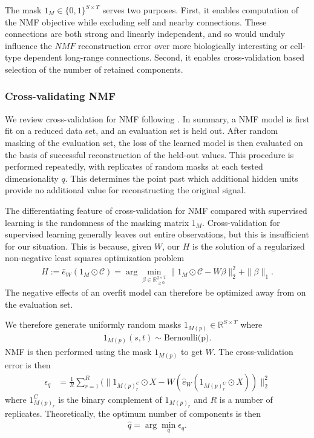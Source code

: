 The mask $1_M \in \{0,1\}^{S \times T}$ serves two purposes.
First, it enables computation of the NMF objective while excluding self and nearby connections.
These connections are both strong and linearly independent, and so would unduly influence the $NMF$ reconstruction error over more biologically interesting or cell-type dependent long-range connections.
Second, it enables cross-validation based selection of the number of retained components.

\subsubsection{Cross-validating NMF}

We review cross-validation for NMF following \citep{Perry2009-ia}.
In summary, a NMF model is first fit on a reduced data set, and an evaluation set is held out.
After random masking of the evaluation set, the loss of the learned model is then evaluated on the basis of successful reconstruction of the held-out values.
This procedure is performed repeatedly, with replicates of random masks at each tested dimensionality $q$.
This determines the point past which additional hidden units provide no additional value for reconstructing the original signal.

The differentiating feature of cross-validation for NMF compared with supervised learning is the randomness of the masking matrix $1_M$.
Cross-validation for supervised learning generally leaves out entire observations, but this is insufficient for our situation.
This is because, given $W$, our $H$ is the solution of a regularized non-negative least squares optimization problem
\begin{eqnarray}
H := \widehat e_W(1_{M} \odot \mathcal C) = \arg \min_{\beta \in \mathbb R_{\geq 0}^{q \times T}} \|1_{M} \odot \mathcal C - W \beta\|_2^2 + \|\beta\|_1.
\label{eq:nmf_nnls}
\end{eqnarray}
The negative effects of an overfit model can therefore be optimized away from on the evaluation set.

We therefore generate uniformly random masks $1_{M(p)} \in \mathbb R^{S \times T}$ where
\begin{align*}
1_{M(p)} (s,t) \sim \text{Bernoulli(p)}.
\end{align*}
NMF is then performed using the mask $1_{M(p)}$ to get $W$.
The cross-validation error is then
\begin{align*}
\epsilon_q &= \frac{1}{R} \sum_{r = 1}^R (\|1_{M(p)_r^C} \odot X - W (\widehat e_W (1_{M(p)_r^C} \odot X ))\|_2^2 
\end{align*}
where $1_{M(p)_r}^C$ is the binary complement of $1_{M(p)_r}$ and $R$ is a number of replicates.
Theoretically, the optimum number of components is then
\begin{align*}
    \widehat q = \arg \min_q \epsilon_q.
\end{align*}

